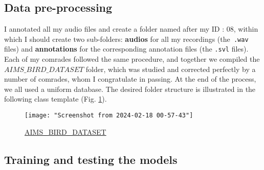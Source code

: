 \documentclass[conference]{IEEEtran}
\begin{document}
\subsection{Data pre-processing}
I annotated all my audio files and create a folder named after my ID : 08, within which I should create two sub-folders: 
\textbf{audios} for all my recordings (the\texttt{ .wav} files) and
\textbf{annotations} for the corresponding annotation files (the \texttt{.svl} files). Each of my comrades followed the same procedure, and together we compiled the $ AIMS\_BIRD\_DATASET $ folder, which was studied and corrected perfectly by a number of comrades, whom I congratulate in passing. At the end of the process, we all used a uniform database.
The desired folder structure is illustrated in the following class template (Fig. \ref{fig:screenshot-from-2024-02-18-00-39-27}).
\begin{figure}[!h]
	\centering
	\texttt{[image: "Screenshot from 2024-02-18 00-57-43"]}
	\caption{\href{https://drive.google.com/drive/folders/1cG94j1OHZPMCgZ6wUc-2mbCuXkd8INQ7?usp=drive_link}{AIMS\_BIRD\_DATASET}}
	\label{fig:screenshot-from-2024-02-18-00-39-27}
\end{figure}





\subsection{Training and testing the models}
\end{document}
